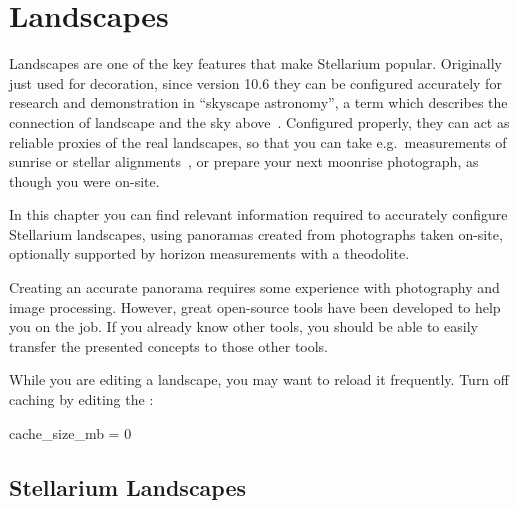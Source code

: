 

\chapter{Landscapes}
\label{ch:landscapes}

\newcommand{\landscape}[1]{\textsf{\textit{\footnotesize #1}}}


Landscapes are one of the key features that make Stellarium popular.
Originally just used for decoration, since version 10.6 they can be
configured accurately for research and demonstration in ``skyscape
astronomy'', a term which describes the connection of landscape and
the sky above~\citep{Brown:JSA2015}. Configured properly, they can act as reliable proxies
of the real landscapes, so that you can take e.g.\ measurements of
sunrise or stellar alignments~\citep{Zotti-Neubauer:SEAC2011}, or prepare your next moonrise
photograph, as though you were on-site.

In this chapter you can find relevant information required to
accurately configure Stellarium landscapes, using panoramas created
from photographs taken on-site, optionally supported by horizon
measurements with a theodolite.


Creating an accurate panorama requires some experience with
photography and image processing. However, great open-source tools
have been developed to help you on the job. If you already know other
tools, you should be able to easily transfer the presented concepts to
those other tools.

While you are editing a landscape, you may want to reload it
frequently. Turn off caching by editing the :

\begin{configfile}
  [landscape]
  cache_size_mb = 0
\end{configfile}

\section{Stellarium Landscapes}
\label{sec:landscapes:StellariumLandscapes}



